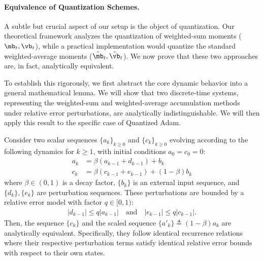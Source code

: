 \documentclass[11pt, letterpaper]{article}
\begin{document}
\paragraph{Equivalence of Quantization Schemes.}
A subtle but crucial aspect of our setup is the object of quantization. Our theoretical framework analyzes the quantization of weighted-sum moments ($\mb_t, \vb_t$), while a practical implementation would quantize the standard weighted-average moments ($\tilde{\mb}_t, \tilde{\vb}_t$). We now prove that these two approaches are, in fact, analytically equivalent.

To establish this rigorously, we first abstract the core dynamic behavior into a general mathematical lemma. We will show that two discrete-time systems, representing the weighted-sum and weighted-average accumulation methods under relative error perturbations, are analytically indistinguishable. We will then apply this result to the specific case of Quantized Adam.

\begin{lemma}
\label{lemma:dynamical_equivalence}
Consider two scalar sequences $\{a_k\}_{k\ge0}$ and $\{c_k\}_{k\ge0}$ evolving according to the following dynamics for $k \ge 1$, with initial conditions $a_0 = c_0 = 0$:
\begin{align}
    \label{eq:system_a}
    a_k &= \beta(a_{k-1} + d_{k-1}) + b_k \\
    \label{eq:system_c}
    c_k &= \beta(c_{k-1} + e_{k-1}) + (1-\beta)b_k
\end{align}
where $\beta \in (0,1)$ is a decay factor, $\{b_k\}$ is an external input sequence, and $\{d_k\}, \{e_k\}$ are perturbation sequences. These perturbations are bounded by a relative error model with factor $q \in [0,1)$:
\begin{align}
    \label{eq:error_bounds}
    |d_{k-1}| \le q|a_{k-1}| \quad \text{and} \quad |e_{k-1}| \le q|c_{k-1}|.
\end{align}
Then, the sequence $\{c_k\}$ and the scaled sequence $\{a'_k\} \triangleq (1-\beta)a_k$ are analytically equivalent. Specifically, they follow identical recurrence relations where their respective perturbation terms satisfy identical relative error bounds with respect to their own states.
\end{lemma}
\end{document}
